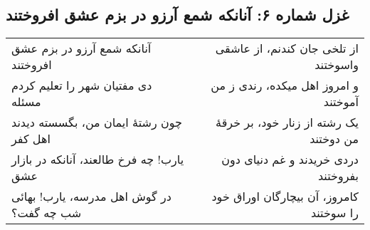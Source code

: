 \begin{center}
\section*{غزل شماره ۶: آنانکه شمع آرزو در بزم عشق افروختند}
\label{sec:006}
\begin{longtable}{l p{0.5cm} r}
آنانکه شمع آرزو در بزم عشق افروختند
&&
از تلخی جان کندنم، از عاشقی واسوختند
\\
دی مفتیان شهر را تعلیم کردم مسئله
&&
و امروز اهل میکده، رندی ز من آموختند
\\
چون رشتهٔ ایمان من، بگسسته دیدند اهل کفر
&&
یک رشته از زنار خود، بر خرقهٔ من دوختند
\\
یارب! چه فرخ طالعند، آنانکه در بازار عشق
&&
دردی خریدند و غم دنیای دون بفروختند
\\
در گوش اهل مدرسه، یارب! بهائی شب چه گفت؟
&&
کامروز، آن بیچارگان اوراق خود را سوختند
\\
\end{longtable}
\end{center}
